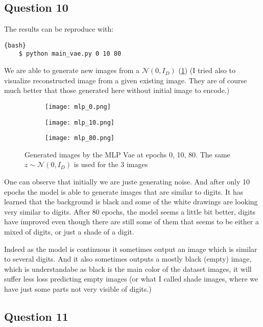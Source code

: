\documentclass{article}
\begin{document}
\subsection*{Question 10}
The results can be reproduce with:

\begin{lstlisting}{bash}
    $ python main_vae.py 0 10 80
\end{lstlisting}

We are able to generate new images from a $\mathcal{N}(0, I_D)$ (\ref{fig:MLP}) (I tried also to visualize reconstructed image
from a given existing image. They are of course much better that those generated here without initial image to encode.)

\begin{figure}[ht]
    \centering
    \begin{subfigure}[b]{0.3\linewidth}
        \texttt{[image: mlp\_0.png]}
    \end{subfigure}
    \begin{subfigure}[b]{0.3\linewidth}
        \texttt{[image: mlp\_10.png]}
    \end{subfigure}
    \begin{subfigure}[b]{0.3\linewidth}
        \texttt{[image: mlp\_80.png]}
    \end{subfigure}
    \caption{Generated images by the MLP Vae at epochs 0, 10, 80. The same $z \sim \mathcal{N}(0, I_D)$ is used for the 3 images}
    \label{fig:MLP}
\end{figure}

One can observe that initially we are juste generating noise. And after only 10 epochs the model is able to generate images that are similar
to digits. It has learned that the background is black and some of the white drawings are looking very similar to digits. After 80 epochs, the
model seems a little bit better, digits have improved even though there are still some of them that seems to be either a mixed of digits,
or just a shade of a digit.

Indeed as the model is continuous it sometimes output an image which is similar to several digits. And it also sometimes outputs a mostly
black (empty) image, which is understandabe as black is the main color of the dataset images, it will suffer less loss predicting empty images
(or what I called shade images, where we have just some parts not very visible of digits.)

\subsection*{Question 11}
\end{document}
